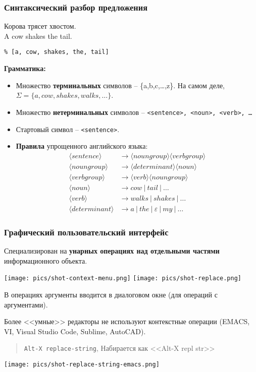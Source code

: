 \documentclass[10pt]{beamer}
\begin{document}
\begin{frame}[fragile]
  \frametitle{Синтаксический разбор предложения}
  Корова трясет хвостом.\\
  A cow shakes the tail.

  \verb|% [a, cow, shakes, the, tail]|

  \textbf{Грамматика:}
  \begin{itemize}
  \item Множество \textbf{терминальных} символов -- \{a,b,c,\ldots,z\}.  На самом деле, $\Sigma=\{a,cow,shakes,walks,\ldots\}$.
  \item Множество \textbf{нетерминальных} символов -- \texttt{<sentence>, <noun>, <verb>, \ldots}
  \item \textnormal{Стартовый} символ -- \texttt{<sentence>}.
  \item \textbf{Правила} упрощенного английского языка:
    \begin{align}
      \label{eq:eng-gramm}
      \langle{}sentence\rangle{} & \to  \langle{}noun group\rangle{} \langle{}verb group\rangle{} \\
      \langle{}noun group\rangle{} & \to  \langle{}determinant\rangle{} \langle{}noun\rangle{} \\
      \langle{}verb group\rangle{} & \to  \langle{}verb\rangle{} \langle{}noun group\rangle{} \\
      \langle{}noun\rangle{} & \to cow\ |\ tail\ |\ \ldots \\
      \langle{}verb\rangle{} & \to walks\ |\ shakes\ |\ \ldots \\
      \langle{}determinant\rangle{} & \to a\ |\ the\ |\ \varepsilon\ |\ my\ |\ \ldots
    \end{align}
  \end{itemize}
\end{frame}






\begin{frame}
  \frametitle{Графический пользовательский интерфейс}
  Специализирован на \textbf{унарных операциях над отдельными частями} информационного объекта.
  \begin{center}
    \texttt{[image: pics/shot-context-menu.png]}\qquad
    \texttt{[image: pics/shot-replace.png]}
  \end{center}
  В операциях аргументы вводится в диалоговом окне (для операций с аргументами).

  Более <<умные>> редакторы не используют контекстные операции (EMACS, VI, Visual Studio Code, Sublime, AutoCAD).
\begin{quote}
  \texttt{Alt-X replace-string}, Набирается как <<Alt-X repl str>>
\end{quote}
\begin{center}
    \texttt{[image: pics/shot-replace-string-emacs.png]}\qquad
  \end{center}
\end{frame}
\end{document}

